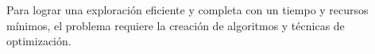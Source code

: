 \documentclass[sigconf]{acmart}
\begin{document}


Para lograr una exploraci\'{o}n eficiente y completa con un tiempo y recursos m\'{i}nimos, el problema requiere la creaci\'{o}n de algoritmos y t\'{e}cnicas de optimizaci\'{o}n.\\




\end{document}
